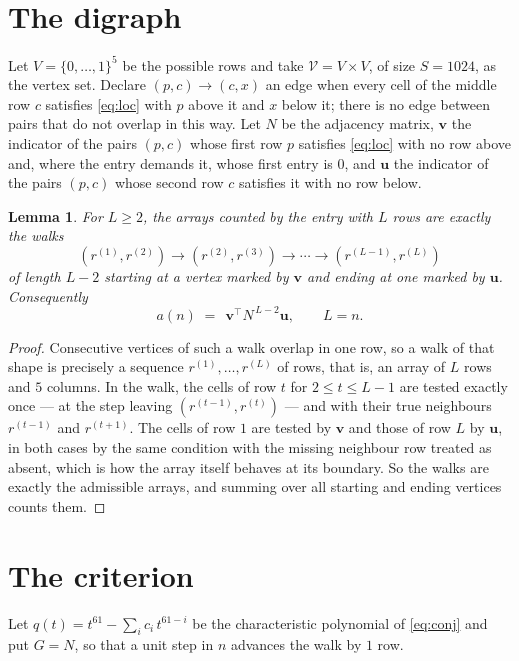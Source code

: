 \documentclass[11pt,a4paper]{article}
\theoremstyle{plain}
\newtheorem{lemma}[theorem]{Lemma}
\theoremstyle{definition}
\begin{document}
\section{The digraph}

Let $V=\{0,\dots,1\}^{5}$ be the possible rows and take
$\mathcal V=V\times V$, of size $S=1024$, as the vertex set. Declare $(p,c)\to(c,x)$ an edge
when every cell of the middle row $c$ satisfies \eqref{eq:loc} with $p$ above it and $x$
below it; there is no edge between pairs that do not overlap in this way. Let $N$ be the
adjacency matrix, $\mathbf{v}$ the indicator of the pairs $(p,c)$ whose first row $p$
satisfies \eqref{eq:loc} with no row above and, where the entry demands it, whose first entry is $0$, and $\mathbf{u}$ the indicator of
the pairs $(p,c)$ whose second row $c$ satisfies it with no row below.

\begin{lemma}\label{lem:walk}
For $L\ge2$, the arrays counted by the entry with $L$ rows are exactly the walks
\[
(r^{(1)},r^{(2)})\to(r^{(2)},r^{(3)})\to\cdots\to(r^{(L-1)},r^{(L)})
\]
of length $L-2$ starting at a vertex marked by $\mathbf{v}$ and ending at one marked by
$\mathbf{u}$. Consequently
\[
a(n)\;=\;\,\mathbf{v}^{\!\top}N^{\,L-2}\mathbf{u},\qquad L=n .
\]
\end{lemma}

\begin{proof}
Consecutive vertices of such a walk overlap in one row, so a walk of that shape is
precisely a sequence $r^{(1)},\dots,r^{(L)}$ of rows, that is, an array of $L$ rows
and $5$ columns. In the walk, the cells of row $t$ for $2\le t\le L-1$ are tested
exactly once --- at the step leaving $(r^{(t-1)},r^{(t)})$ --- and with their true
neighbours $r^{(t-1)}$ and $r^{(t+1)}$. The cells of row $1$ are tested by
$\mathbf{v}$ and those of row $L$ by $\mathbf{u}$, in both cases by the same condition
with the missing neighbour row treated as absent, which is how the array itself behaves at
its boundary. So the walks are exactly the admissible arrays, and summing over all starting
and ending vertices counts them.
\end{proof}

\section{The criterion}

Let $q(t)=t^{61}-\sum_i c_i\,t^{61-i}$ be the characteristic polynomial of
\eqref{eq:conj} and put $G=N$, so that a unit step in $n$ advances the walk by
$1$ row.
\end{document}
